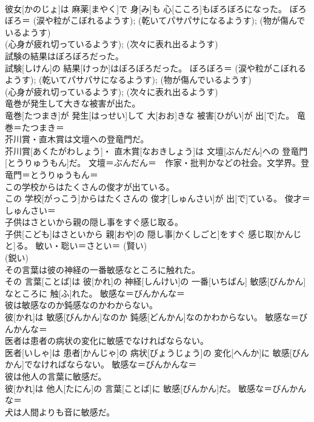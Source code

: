 \documentclass[8pt]{extreport}
\begin{document}
\begin{CJK}{UTF8}{min}
{\\	彼女[かのじょ]は 麻薬[まやく]で 身[み]も 心[こころ]もぼろぼろになった。	ぼろぼろ＝ (涙や粒がこぼれるようす); (乾いてパサパサになるようす); (物が傷んでいるようす) 
\\	(心身が疲れ切っているようす); (次々に表れ出るようす)
\\	試験の結果はぼろぼろだった。	
\\	試験[しけん]の 結果[けっか]はぼろぼろだった。	ぼろぼろ＝ (涙や粒がこぼれるようす); (乾いてパサパサになるようす); (物が傷んでいるようす) 
\\	(心身が疲れ切っているようす); (次々に表れ出るようす)
\\	竜巻が発生して大きな被害が出た。	
\\	竜巻[たつまき]が 発生[はっせい]して 大[おお]きな 被害[ひがい]が 出[で]た。	竜巻＝たつまき＝ 
\\	芥川賞・直木賞は文壇への登竜門だ。	
\\	芥川賞[あくたがわしょう]・ 直木賞[なおきしょう]は 文壇[ぶんだん]への 登竜門[とうりゅうもん]だ。	文壇＝ぶんだん＝　作家・批判かなどの社会。文学界。登竜門＝とうりゅうもん＝ 
\\	この学校からはたくさんの俊才が出ている。	
\\	この 学校[がっこう]からはたくさんの 俊才[しゅんさい]が 出[で]ている。	俊才＝しゅんさい＝ 
\\	子供はさといから親の隠し事をすぐ感じ取る。	
\\	子供[こども]はさといから 親[おや]の 隠し事[かくしごと]をすぐ 感じ取[かんじと]る。	敏い・聡い＝さとい＝ (賢い) 
\\	(鋭い) 
\\	その言葉は彼の神経の一番敏感なところに触れた。	
\\	その 言葉[ことば]は 彼[かれ]の 神経[しんけい]の 一番[いちばん] 敏感[びんかん]なところに 触[ふ]れた。	敏感な＝びんかんな＝ 
\\	彼は敏感なのか鈍感なのかわからない。	
\\	彼[かれ]は 敏感[びんかん]なのか 鈍感[どんかん]なのかわからない。	敏感な＝びんかんな＝ 
\\	医者は患者の病状の変化に敏感でなければならない。	
\\	医者[いしゃ]は 患者[かんじゃ]の 病状[びょうじょう]の 変化[へんか]に 敏感[びんかん]でなければならない。	敏感な＝びんかんな＝ 
\\	彼は他人の言葉に敏感だ。	
\\	彼[かれ]は 他人[たにん]の 言葉[ことば]に 敏感[びんかん]だ。	敏感な＝びんかんな＝ 
\\	犬は人間よりも音に敏感だ。	
}
\end{CJK}
\end{document}
